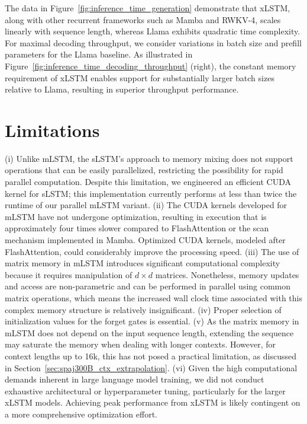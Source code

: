 The data in Figure~\ref{fig:inference_time_generation} demonstrate that xLSTM, along with other recurrent frameworks such as Mamba and RWKV-4, scales linearly with sequence length, whereas Llama exhibits quadratic time complexity. For maximal decoding throughput, we consider variations in batch size and prefill parameters for the Llama baseline. As illustrated in Figure~\ref{fig:inference_time_decoding_throughput} (right), the constant memory requirement of xLSTM enables support for substantially larger batch sizes relative to Llama, resulting in superior throughput performance.

\section{Limitations}

(i) Unlike mLSTM, the sLSTM's approach to memory mixing does not support operations that can be easily parallelized, restricting the possibility for rapid parallel computation. Despite this limitation, we engineered an efficient CUDA kernel for sLSTM; this implementation currently performs at less than twice the runtime of our parallel mLSTM variant. (ii) The CUDA kernels developed for mLSTM have not undergone optimization, resulting in execution that is approximately four times slower compared to FlashAttention or the scan mechanism implemented in Mamba. Optimized CUDA kernels, modeled after FlashAttention, could considerably improve the processing speed. (iii) The use of matrix memory in mLSTM introduces significant computational complexity because it requires manipulation of $d \times d$ matrices. Nonetheless, memory updates and access are non-parametric and can be performed in parallel using common matrix operations, which means the increased wall clock time associated with this complex memory structure is relatively insignificant. (iv) Proper selection of initialization values for the forget gates is essential. (v) As the matrix memory in mLSTM does not depend on the input sequence length, extending the sequence may saturate the memory when dealing with longer contexts. However, for context lengths up to 16k, this has not posed a practical limitation, as discussed in Section~\ref{sec:spaj300B_ctx_extrapolation}. (vi) Given the high computational demands inherent in large language model training, we did not conduct exhaustive architectural or hyperparameter tuning, particularly for the larger xLSTM models. Achieving peak performance from xLSTM is likely contingent on a more comprehensive optimization effort.

